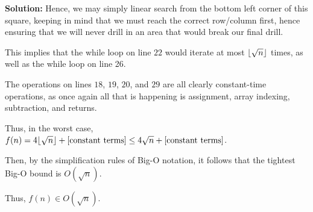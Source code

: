 \documentclass[a4,13pt]{extarticle}
\DeclarePairedDelimiter\floor{\lfloor}{\rfloor}
\newenvironment{Solution}{\color{blue}\textbf{Solution:}}{}
\begin{document}
\begin{enumerate}
\begin{enumerate}
\begin{Solution}
Hence, we may simply linear search from the bottom left corner of this square, keeping in mind that we must reach the correct row/column first, hence ensuring that we will never drill in an area that would break our final drill.

This implies that the while loop on line $22$ would iterate at most $\floor{\sqrt{n}}$ times, as well as the while loop on line 26.

The operations on lines $18$, $19$, $20$, and $29$ are all clearly constant-time operations, as once again all that is happening is assignment, array indexing, subtraction, and returns.

Thus, in the worst case, $f(n)=4\floor{\sqrt{n}}+\text{[constant terms]}\le4\sqrt{n}+\text{[constant terms]}$.

Then, by the simplification rules of Big-O notation, it follows that the tightest Big-O bound is $O(\sqrt{n})$.

Thus, $f(n)\in O(\sqrt{n})$.
	      	\end{Solution}
	      	      	      	              
	      \end{enumerate}
	      	          
\end{enumerate}
\end{document}
